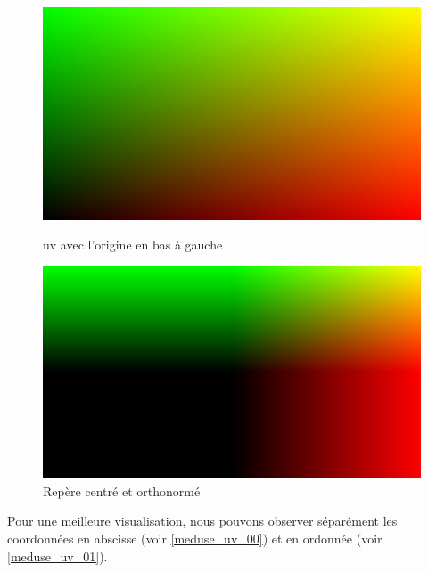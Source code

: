 \begin{figure}[h]
  \begin{minipage}[b]{0.45\linewidth}
    \centering
    \includegraphics[width=\linewidth]{images/meduse/meduse_00.JPG}
    \caption{uv avec l'origine en bas à gauche}
    \label{meduse_00}
  \end{minipage}
  \hspace{0.1\linewidth} %
  \begin{minipage}[b]{0.45\linewidth}
    \centering
    \includegraphics[width=\linewidth]{images/meduse/meduse_01.JPG}
    \caption{Repère centré et orthonormé}
    \label{meduse_01}
  \end{minipage}
\end{figure}







Pour une meilleure visualisation, nous pouvons observer séparément les coordonnées en abscisse (voir \ref{meduse_uv_00}) et en ordonnée (voir \ref{meduse_uv_01}).

